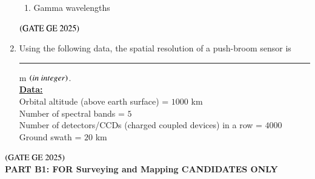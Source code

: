 \documentclass[journal,12pt,onecolumn]{IEEEtran}
\theoremstyle{remark}
\begin{document}
\begin{enumerate}
\begin{enumerate}
\item Gamma wavelengths
\end{enumerate}
\hfill $\left(\text{GATE GE 2025}\right)$
\bigskip
\item Using the following data, the spatial resolution of a push-broom sensor is \rule{2cm}{0.5mm} m $\left(in\ integer\right)$.
\\
\underline{\textbf{Data:}} \\
Orbital altitude (above earth surface) = $1000$ km \\
Number of spectral bands = $5$ \\
Number of detectors/CCDs (charged coupled devices) in a row = $4000$ \\
Ground swath = $20$ km
\end{enumerate}
\hfill $\left(\text{GATE GE 2025}\right)$
\bigskip
\\
\textbf{PART B1: FOR Surveying and Mapping CANDIDATES ONLY}\\
\end{document}
